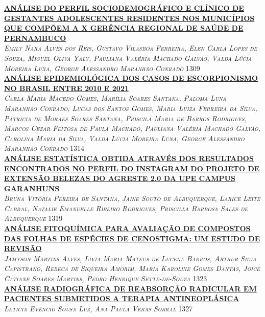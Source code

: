 \noindent \textsc{\hyperlink{trabalhos/251792.pdf.1}{\textbf{ANÁLISE DO PERFIL SOCIODEMOGRÁFICO E CLÍNICO DE GESTANTES ADOLESCENTES RESIDENTES NOS MUNICÍPIOS QUE COMPÕEM A X GERÊNCIA REGIONAL DE SAÚDE DE PERNAMBUCO}}}\\ 
\noindent \textsc{\textit{Emily Nara Alves dos Reis, Gustavo Vilasboa Ferreira, Elen Carla Lopes de Souza, Miguel Oliva Yaly, Pauliana Valéria Machado Galvão, Valda Lúcia Moreira Luna, George Alessandro Maranhão Conrado}} \hfill 1309\\ 

\noindent \textsc{\hyperlink{trabalhos/251514.pdf.1}{\textbf{ANÁLISE EPIDEMIOLÓGICA DOS CASOS DE ESCORPIONISMO NO BRASIL ENTRE 2010 E 2021}}}\\ 
\noindent \textsc{\textit{Carla Maria Macedo Gomes, Marília Soares Santana, Paloma Luna Maranhão Conrado, Lucas dos Santos Gomes, Maria Luiza Ferreira da Silva, Patrícia de Moraes Soares Santana, Priscila Maria de Barros Rodrigues, Marcos Cezar Feitosa de Paula Machado, Pauliana Valéria Machado Galvão, Carolina Maria da Silva, Valda Lúcia Moreira Luna, George Alessandro Maranhão Conrado}} \hfill 1314\\ 

\noindent \textsc{\hyperlink{trabalhos/248374.pdf.1}{\textbf{ANÁLISE ESTATÍSTICA OBTIDA ATRAVÉS DOS RESULTADOS ENCONTRADOS NO PERFIL DO INSTAGRAM DO PROJETO DE EXTENSÃO BELEZAS DO AGRESTE 2.0 DA UPE CAMPUS GARANHUNS}}}\\ 
\noindent \textsc{\textit{Bruna Vitória Pereira de Santana, Jaine Souto de Albuquerque, Larice Leite Cabral, Natalie Emanuelle Ribeiro Rodrigues, Priscilla Barbosa Sales de Albuquerque}} \hfill 1319\\ 

\noindent \textsc{\hyperlink{trabalhos/250668.pdf.1}{\textbf{ANÁLISE FITOQUÍMICA PARA AVALIAÇÃO DE COMPOSTOS DAS FOLHAS DE ESPÉCIES DE CENOSTIGMA: UM ESTUDO DE REVISÃO}}}\\ 
\noindent \textsc{\textit{Jamyson Martins Alves, Lívia Maria Mateus de Lucena Barros, Arthur Silva Capistrano, Rebeca de Siqueira Amorim, Maria Karoline Gomes Dantas, Joice Catiane Soares Martins, Pedro Henrique Sette-de-Souza}} \hfill 1323\\ 

\noindent \textsc{\hyperlink{trabalhos/251394.pdf.1}{\textbf{ANÁLISE RADIOGRÁFICA DE REABSORÇÃO RADICULAR EM PACIENTES SUBMETIDOS A TERAPIA ANTINEOPLÁSICA }}}\\ 
\noindent \textsc{\textit{Letícia Evêncio Sousa Luz, Ana Paula Veras Sobral}} \hfill 1327\\ 

